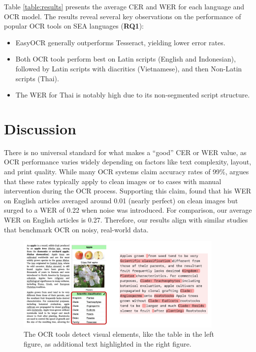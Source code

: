 \documentclass[12pt,oneside]{memoir}
\begin{document}
Table \ref{table:results} presents the average CER and WER for each language and 
OCR model. The results reveal several key observations on the performance of popular OCR tools on SEA languages (\textbf{RQ1}):

\begin{itemize}
    \item EasyOCR generally outperforms Tesseract, yielding lower error rates.
    \item Both OCR tools perform best on Latin scripts (English and Indonesian), followed by Latin scripts with diacritics (Vietnamese), and then Non-Latin scripts (Thai).
    \item The WER for Thai is notably high due to its non-segmented script structure.
\end{itemize}

\section{Discussion}
There is no universal standard for what makes a “good” CER or WER value, as OCR 
performance varies widely depending on factors like text complexity, layout, and 
print quality. While many OCR systems claim accuracy rates of 99\%, \textcite{holley-2009} argues 
that these rates typically apply to clean images or to cases with manual 
intervention during the OCR process. Supporting this claim, \textcite{hegghammer-2022} found that his 
WER on English articles averaged around 0.01 (nearly perfect) on clean images 
but surged to a WER of 0.22 when noise was introduced. For comparison, our 
average WER on English articles is 0.27. Therefore, our results align with 
similar studies that benchmark OCR on noisy, real-world data. 

\begin{figure}[ht]
    \centering
    \includegraphics[width=0.9\textwidth]{images/multimodal-content.png}
    \caption{The OCR tools detect visual elements, like the table in the left figure, as additional text highlighted in the right figure.}
    \label{figure:multimodal-content}
\end{figure}
\end{document}
